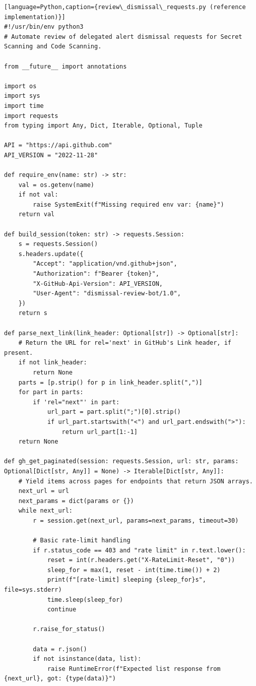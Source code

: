 \documentclass[11pt]{article}
\begin{document}
\begin{verbatim}[language=Python,caption={review\_dismissal\_requests.py (reference implementation)}]
#!/usr/bin/env python3
# Automate review of delegated alert dismissal requests for Secret Scanning and Code Scanning.

from __future__ import annotations

import os
import sys
import time
import requests
from typing import Any, Dict, Iterable, Optional, Tuple

API = "https://api.github.com"
API_VERSION = "2022-11-28"

def require_env(name: str) -> str:
    val = os.getenv(name)
    if not val:
        raise SystemExit(f"Missing required env var: {name}")
    return val

def build_session(token: str) -> requests.Session:
    s = requests.Session()
    s.headers.update({
        "Accept": "application/vnd.github+json",
        "Authorization": f"Bearer {token}",
        "X-GitHub-Api-Version": API_VERSION,
        "User-Agent": "dismissal-review-bot/1.0",
    })
    return s

def parse_next_link(link_header: Optional[str]) -> Optional[str]:
    # Return the URL for rel='next' in GitHub's Link header, if present.
    if not link_header:
        return None
    parts = [p.strip() for p in link_header.split(",")]
    for part in parts:
        if 'rel="next"' in part:
            url_part = part.split(";")[0].strip()
            if url_part.startswith("<") and url_part.endswith(">"):
                return url_part[1:-1]
    return None

def gh_get_paginated(session: requests.Session, url: str, params: Optional[Dict[str, Any]] = None) -> Iterable[Dict[str, Any]]:
    # Yield items across pages for endpoints that return JSON arrays.
    next_url = url
    next_params = dict(params or {})
    while next_url:
        r = session.get(next_url, params=next_params, timeout=30)

        # Basic rate-limit handling
        if r.status_code == 403 and "rate limit" in r.text.lower():
            reset = int(r.headers.get("X-RateLimit-Reset", "0"))
            sleep_for = max(1, reset - int(time.time()) + 2)
            print(f"[rate-limit] sleeping {sleep_for}s", file=sys.stderr)
            time.sleep(sleep_for)
            continue

        r.raise_for_status()

        data = r.json()
        if not isinstance(data, list):
            raise RuntimeError(f"Expected list response from {next_url}, got: {type(data)}")


\end{verbatim}
\end{document}

